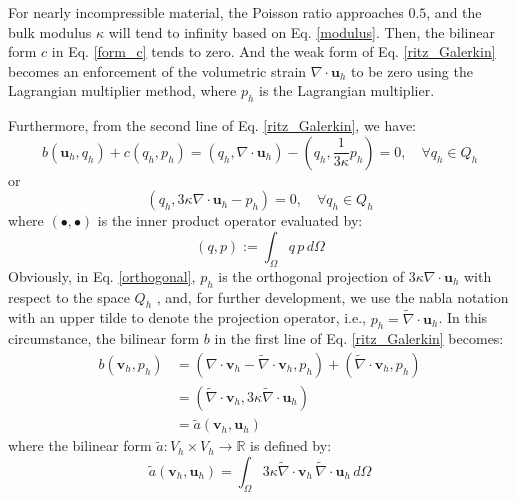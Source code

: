 For nearly incompressible material, the Poisson ratio approaches $0.5$, and the bulk modulus $\kappa$ will tend to infinity based on Eq. \eqref{modulus}. Then, the bilinear form $c$ in Eq. \eqref{form_c} tends to zero. And the weak form of Eq. \eqref{ritz_Galerkin} becomes an enforcement of the volumetric strain $\nabla \cdot \boldsymbol{u}_h$ to be zero using the Lagrangian multiplier method, where $p_h$ is the Lagrangian multiplier.

Furthermore, from the second line of Eq. \eqref{ritz_Galerkin}, we have:
\begin{equation}
b(\boldsymbol{u}_h, q_h) + c(q_h, p_h) = (q_h, \nabla \cdot \boldsymbol{u}_h) - (q_h, \frac{1}{3\kappa} p_h) = 0, \quad \forall q_h \in Q_h
\end{equation}
or
\begin{equation}\label{orthogonal}
(q_h, 3\kappa \nabla \cdot \boldsymbol{u}_h - p_h) = 0, \quad \forall q_h \in Q_h
\end{equation}
where $(\bullet, \bullet)$ is the inner product operator evaluated by:
\begin{equation}
(q, p) := \int_\Omega q \, p \, d\Omega
\end{equation}
Obviously, in Eq. \eqref{orthogonal}, $p_h$ is the orthogonal projection of $3\kappa \nabla \cdot \boldsymbol{u}_h$ with respect to the space $Q_h$ \cite{brezzi1991a}, and, for further development, we use the nabla notation with an upper tilde to denote the projection operator, i.e., $p_h = \tilde{\nabla} \cdot \boldsymbol{u}_h$. In this circumstance, the bilinear form $b$ in the first line of Eq. \eqref{ritz_Galerkin} becomes:
\begin{equation}
\begin{split}
b(\boldsymbol{v}_h, p_h) &= \left(\nabla \cdot \boldsymbol{v}_h - \tilde{\nabla} \cdot \boldsymbol{v}_h, p_h\right) + \left(\tilde{\nabla} \cdot \boldsymbol{v}_h, p_h\right) \\
&= \left(\tilde{\nabla} \cdot \boldsymbol{v}_h, 3\kappa \tilde{\nabla} \cdot \boldsymbol{u}_h\right) \\
&= \tilde{a}(\boldsymbol{v}_h, \boldsymbol{u}_h)
\end{split}
\end{equation}
where the bilinear form $\tilde{a}: V_h \times V_h \rightarrow \mathbb{R}$ is defined by:
\begin{equation}
\tilde{a}(\boldsymbol{v}_h, \boldsymbol{u}_h) = \int_\Omega 3\kappa \tilde{\nabla} \cdot \boldsymbol{v}_h \, \tilde{\nabla} \cdot \boldsymbol{u}_h \, d\Omega
\end{equation}


